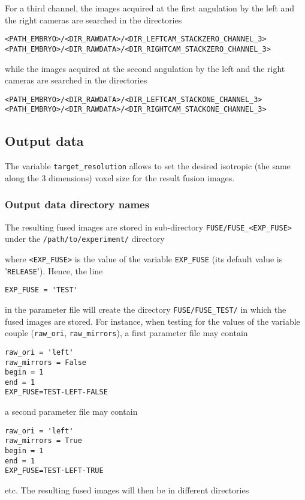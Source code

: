 For a third channel, 
the images acquired at the first angulation by the
left and the right cameras are searched in the directories
\begin{verbatim}
<PATH_EMBRYO>/<DIR_RAWDATA>/<DIR_LEFTCAM_STACKZERO_CHANNEL_3>
<PATH_EMBRYO>/<DIR_RAWDATA>/<DIR_RIGHTCAM_STACKZERO_CHANNEL_3>
\end{verbatim}
while the images acquired at the second angulation by the
left and the right cameras are searched in the directories
\begin{verbatim}
<PATH_EMBRYO>/<DIR_RAWDATA>/<DIR_LEFTCAM_STACKONE_CHANNEL_3>
<PATH_EMBRYO>/<DIR_RAWDATA>/<DIR_RIGHTCAM_STACKONE_CHANNEL_3>
\end{verbatim}



\subsection{Output data}
\label{sec:cli:fuse:output:data}

The variable \texttt{target\_resolution} allows to set the desired isotropic (the
same along the 3 dimensions) voxel size for the result fusion
images.

\subsubsection{Output data directory names}

The resulting fused images are stored in sub-directory
\texttt{FUSE/FUSE\_<EXP\_FUSE>} under the
\texttt{/path/to/experiment/} directory 

\mbox{}
\mbox{}

where \texttt{<EXP\_FUSE>} is the value of the variable \texttt{EXP\_FUSE} (its
default value is '\texttt{RELEASE}'). Hence, the line
\begin{verbatim}
EXP_FUSE = 'TEST'
\end{verbatim}
in the parameter file will create the directory
\texttt{FUSE/FUSE\_TEST/} in which the fused images are stored. For
instance, when testing for the values of the variable couple
(\texttt{raw\_ori}, \texttt{raw\_mirrors}), a first parameter file may
contain
\begin{verbatim}
raw_ori = 'left'
raw_mirrors = False
begin = 1
end = 1
EXP_FUSE=TEST-LEFT-FALSE
\end{verbatim}
a second parameter file may
contain
\begin{verbatim}
raw_ori = 'left'
raw_mirrors = True
begin = 1
end = 1
EXP_FUSE=TEST-LEFT-TRUE
\end{verbatim}
etc. The resulting fused images will then be in different directories


